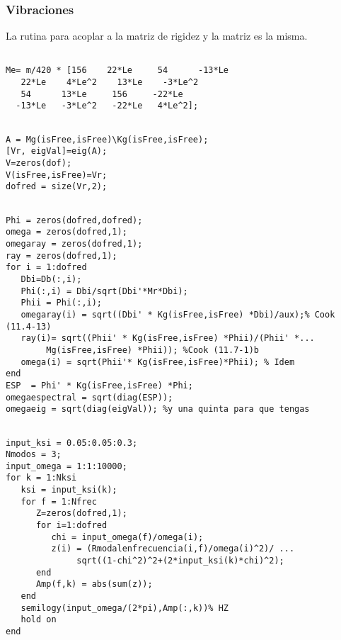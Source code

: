 \subsubsection{Vibraciones}
La rutina para acoplar a la matriz de rigidez y la matriz es la misma.
\begin{code}
	\begin{verbatim}
	
Me= m/420 * [156    22*Le     54      -13*Le
   22*Le    4*Le^2    13*Le    -3*Le^2
   54      13*Le     156     -22*Le
  -13*Le   -3*Le^2   -22*Le   4*Le^2];
	\end{verbatim}
\end{code}


\begin{code}
	\begin{verbatim}
	
A = Mg(isFree,isFree)\Kg(isFree,isFree);
[Vr, eigVal]=eig(A);
V=zeros(dof);
V(isFree,isFree)=Vr;
dofred = size(Vr,2);
	\end{verbatim}
\end{code}


\begin{code}
	\begin{verbatim}
	
Phi = zeros(dofred,dofred);
omega = zeros(dofred,1);
omegaray = zeros(dofred,1);
ray = zeros(dofred,1);
for i = 1:dofred
   Dbi=Db(:,i);
   Phi(:,i) = Dbi/sqrt(Dbi'*Mr*Dbi);
   Phii = Phi(:,i); 
   omegaray(i) = sqrt((Dbi' * Kg(isFree,isFree) *Dbi)/aux);% Cook (11.4-13)
   ray(i)= sqrt((Phii' * Kg(isFree,isFree) *Phii)/(Phii' *...
        Mg(isFree,isFree) *Phii)); %Cook (11.7-1)b
   omega(i) = sqrt(Phii'* Kg(isFree,isFree)*Phii); % Idem
end
ESP  = Phi' * Kg(isFree,isFree) *Phi;
omegaespectral = sqrt(diag(ESP));
omegaeig = sqrt(diag(eigVal)); %y una quinta para que tengas
	\end{verbatim}
\end{code}

\begin{code}
	\begin{verbatim}
	
input_ksi = 0.05:0.05:0.3;
Nmodos = 3;
input_omega = 1:1:10000;
for k = 1:Nksi
   ksi = input_ksi(k);
   for f = 1:Nfrec
      Z=zeros(dofred,1);
      for i=1:dofred
         chi = input_omega(f)/omega(i);
         z(i) = (Rmodalenfrecuencia(i,f)/omega(i)^2)/ ...
              sqrt((1-chi^2)^2+(2*input_ksi(k)*chi)^2);
      end
      Amp(f,k) = abs(sum(z));
   end
   semilogy(input_omega/(2*pi),Amp(:,k))% HZ
   hold on
end
	\end{verbatim}
\end{code}

